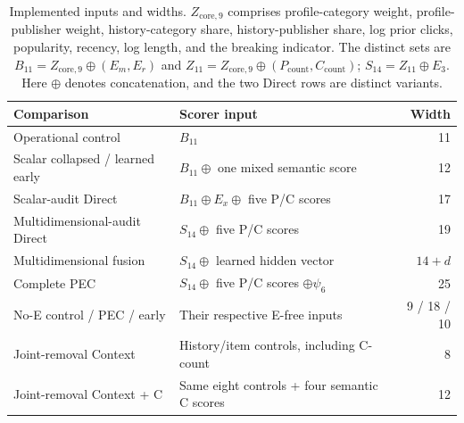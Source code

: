 \begin{table}[!t]
\renewcommand{\arraystretch}{1.10}
\centering
\caption{Implemented inputs and widths. $Z_{\mathrm{core},9}$ comprises profile-category weight, profile-publisher weight, history-category share, history-publisher share, log prior clicks, popularity, recency, log length, and the breaking indicator. The distinct sets are $B_{11}=Z_{\mathrm{core},9}\oplus(E_m,E_r)$ and $Z_{11}=Z_{\mathrm{core},9}\oplus(P_{\mathrm{count}},C_{\mathrm{count}})$; $S_{14}=Z_{11}\oplus E_3$. Here $\oplus$ denotes concatenation, and the two Direct rows are distinct variants.}
\label{tab:comparison_design}
\small
\setlength{\tabcolsep}{5pt}
\begin{tabular*}{\linewidth}{@{\extracolsep{\fill}}llr@{}}
\toprule
Comparison & Scorer input & Width \\
\midrule
Operational control & $B_{11}$ & 11 \\
Scalar collapsed / learned early & $B_{11}\oplus$ one mixed semantic score & 12 \\
Scalar-audit Direct & $B_{11}\oplus E_x\oplus$ five P/C scores & 17 \\
Multidimensional-audit Direct & $S_{14}\oplus$ five P/C scores & 19 \\
Multidimensional fusion & $S_{14}\oplus$ learned hidden vector & $14+d$ \\
Complete PEC & $S_{14}\oplus$ five P/C scores $\oplus\psi_6$ & 25 \\
No-E control / PEC / early & Their respective E-free inputs & 9 / 18 / 10 \\
Joint-removal Context & History/item controls, including C-count & 8 \\
Joint-removal Context + C & Same eight controls + four semantic C scores & 12 \\
\bottomrule
\end{tabular*}
\end{table}
